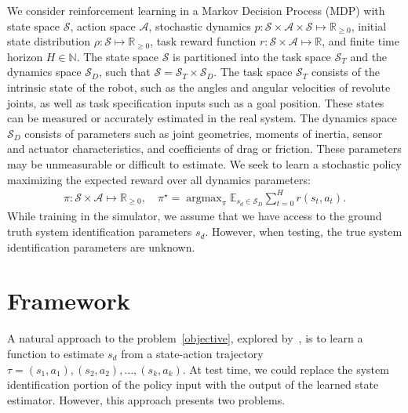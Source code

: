 \documentclass{article}
\newcommand{\R}{\mathbb{R}}
\newcommand{\E}{\mathbb{E}}
\newcommand{\cA}{\mathcal{A}}
\newcommand{\cS}{\mathcal{S}}
\DeclareMathOperator*{\argmax}{argmax}
\begin{document}
We consider reinforcement learning in a Markov Decision Process (MDP)
with state space $\cS$,
action space $\cA$,
stochastic dynamics $p : \cS \times \cA \times \cS \mapsto \R_{\geq 0}$,
initial state distribution $\rho : \cS \mapsto \R_{\geq 0}$,
task reward function $r : \cS \times \cA \mapsto \R$,
and finite time horizon $H \in \mathbb{N}$.
The state space $\cS$ is partitioned into
the task space $\cS_T$
and the dynamics space $\cS_D$, such that $\cS = \cS_T \times \cS_D$.
The task space $\cS_T$ consists of the intrinsic state of the robot, such as the angles and angular velocities of revolute joints, as well as task specification inputs such as a goal position.
These states can be measured or accurately estimated in the real system.
The dynamics space $\cS_D$ consists of parameters such as joint geometries, moments of inertia, sensor and actuator characteristics, and coefficients of drag or friction.
These parameters may be unmeasurable or difficult to estimate.
We seek to learn a stochastic policy maximizing the expected reward over all dynamics parameters:
\begin{equation}\begin{split}
\pi : \cS \times \cA \mapsto \R_{\geq 0}, \quad
\pi^\star = \argmax_\pi \E_{s_d \in \cS_D} \sum_{t = 0}^H
r(s_t, a_t).
\label{objective}
\end{split}\end{equation}
While training in the simulator, we assume that we have access to the ground truth system identification parameters $s_d$.
However, when testing, the true system identification parameters are unknown.

\section{Framework}
A natural approach to the problem~\eqref{objective}, explored by~\citet{yu-up-osi-rss17}, is to learn a function to estimate $s_d$ from a state-action trajectory $\tau = (s_1, a_1), (s_2, a_2), \dots, (s_k, a_k)$.
At test time, we could replace the system identification portion of the policy input
with the output of the learned state estimator.
However, this approach presents two problems.
\end{document}
